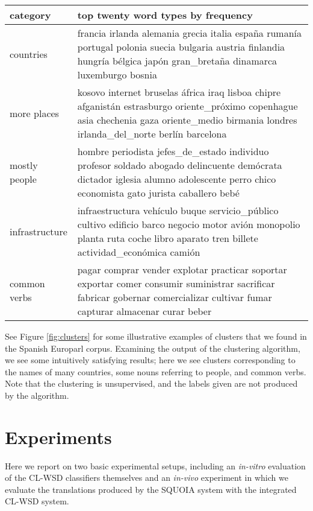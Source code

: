 \documentclass[10pt, a4paper]{article}
\begin{document}
\begin{figure*}[t!]
  \begin{tabular}{|l|p{15cm}|}
    \hline
    category  & top twenty word types by frequency \\
    \hline
    countries & francia irlanda alemania grecia italia españa rumanía portugal polonia suecia bulgaria austria finlandia hungría bélgica japón gran\_bretaña dinamarca luxemburgo bosnia \\
    \hline
    more places & kosovo internet bruselas áfrica iraq lisboa chipre afganistán estrasburgo oriente\_próximo copenhague asia chechenia gaza oriente\_medio birmania londres irlanda\_del\_norte berlín barcelona \\
    \hline
    mostly people & hombre periodista jefes\_de\_estado individuo profesor soldado abogado delincuente demócrata dictador iglesia alumno adolescente perro chico economista gato jurista caballero bebé \\
    \hline
    infrastructure & infraestructura vehículo buque servicio\_público cultivo edificio barco negocio motor avión monopolio planta ruta coche libro aparato tren billete actividad\_económica camión \\
    \hline
    common verbs & pagar comprar vender explotar practicar soportar exportar comer consumir suministrar sacrificar fabricar gobernar comercializar cultivar fumar capturar almacenar curar beber \\
    \hline
  \end{tabular}
\caption{Some illustrative clusters found by the Brown clustering algorithm on
the Spanish Europarl data. These are five out of $C=1000$ clusters, and
were picked and labeled arbitrarily by the authors. The words listed are the
top twenty terms from that cluster, by frequency.}
\label{fig:clusters}
\end{figure*}

See Figure \ref{fig:clusters} for some illustrative examples of clusters that
we found in the Spanish Europarl corpus.  Examining the output of the
clustering algorithm, we see some intuitively satisfying results; here we see
clusters corresponding to the names of many countries, some nouns referring to
people, and common verbs. Note that the clustering is unsupervised, and the
labels given are not produced by the algorithm.

\section{Experiments}
Here we report on two basic experimental setups, including an \emph{in-vitro}
evaluation of the CL-WSD classifiers themselves and an \emph{in-vivo}
experiment in which we evaluate the translations produced by the SQUOIA system
with the integrated CL-WSD system.
\end{document}
